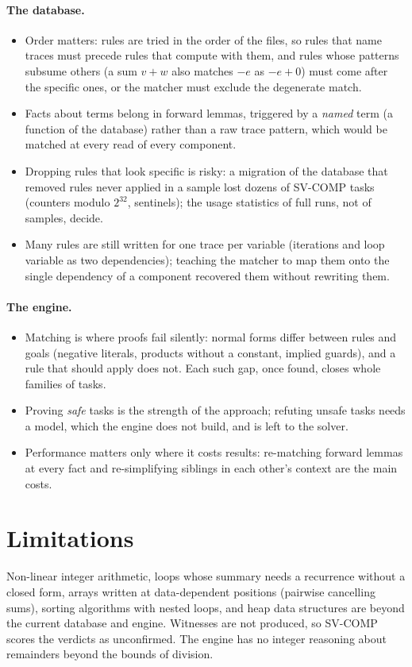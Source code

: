 \documentclass[a4paper,11pt]{article}
\begin{document}
\paragraph{The database.}
\begin{itemize}
\item Order matters: rules are tried in the order of the files, so rules that name traces must precede rules that
  compute with them, and rules whose patterns subsume others (a sum $v + w$ also matches $-e$ as $-e + 0$) must come
  after the specific ones, or the matcher must exclude the degenerate match.
\item Facts about terms belong in forward lemmas, triggered by a \emph{named} term (a function of the database)
  rather than a raw trace pattern, which would be matched at every read of every component.
\item Dropping rules that look specific is risky: a migration of the database that removed rules never applied in a
  sample lost dozens of SV-COMP tasks (counters modulo $2^{32}$, sentinels); the usage statistics of full runs, not
  of samples, decide.
\item Many rules are still written for one trace per variable (iterations and loop variable as two dependencies);
  teaching the matcher to map them onto the single dependency of a component recovered them without rewriting them.
\end{itemize}

\paragraph{The engine.}
\begin{itemize}
\item Matching is where proofs fail silently: normal forms differ between rules and goals (negative literals,
  products without a constant, implied guards), and a rule that should apply does not. Each such gap, once found,
  closes whole families of tasks.
\item Proving \emph{safe} tasks is the strength of the approach; refuting unsafe tasks needs a
  model, which the engine does not build, and is left to the solver.
\item Performance matters only where it costs results: re-matching forward lemmas at every fact and re-simplifying
  siblings in each other's context are the main costs.
\end{itemize}

\section{Limitations}

Non-linear integer arithmetic, loops whose summary needs a recurrence without a closed form, arrays written at
data-dependent positions (pairwise cancelling sums), sorting algorithms with nested loops, and heap data
structures are beyond the current database and engine. Witnesses are not produced, so SV-COMP scores the verdicts
as unconfirmed. The engine has no integer reasoning about remainders beyond the bounds of division.
\end{document}
